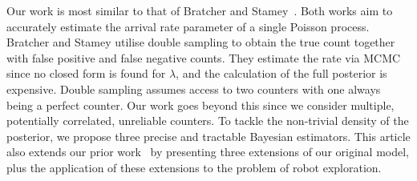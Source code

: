 Our work is most similar to that of Bratcher and Stamey~\cite{bratcher2002}. Both works aim to accurately estimate the arrival rate parameter of a single Poisson process. Bratcher and Stamey utilise double sampling to obtain the true count together with false positive and false negative counts. They estimate the  rate via MCMC since no closed form is found for $\lambda$, and the calculation of the full posterior is expensive. Double sampling assumes access to two counters with one always being a perfect counter. Our work goes beyond this since we consider multiple, potentially correlated, unreliable counters. To tackle the non-trivial density of the posterior, we propose three precise and tractable Bayesian estimators. This article also extends our prior work~\cite{jovan18a} by presenting three extensions of our original model, plus the application of these extensions to the problem of robot exploration.


